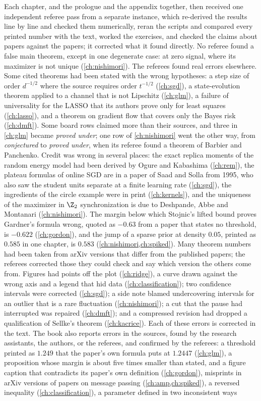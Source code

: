 Each chapter, and the prologue and the appendix together, then received one independent referee pass from a separate instance, which re-derived the results line by line and checked them numerically, reran the scripts and compared every printed number with the text, worked the exercises, and checked the claims about papers against the papers; it corrected what it found directly. No referee found a false main theorem, except in one degenerate case: at zero signal, where its maximizer is not unique (\cref{ch:nishimori}). The referees found real errors elsewhere. Some cited theorems had been stated with the wrong hypotheses: a step size of order $d^{-1/2}$ where the source requires order $t^{-1/2}$ (\cref{ch:sgd}), a state-evolution theorem applied to a channel that is not Lipschitz (\cref{ch:glm}), a failure of universality for the LASSO that its authors prove only for least squares (\cref{ch:lasso}), and a theorem on gradient flow that covers only the Bayes risk (\cref{ch:dmft}). Some board rows claimed more than their sources, and three in \cref{ch:glm} became \emph{proved under}; one row of \cref{ch:nishimori} went the other way, from \emph{conjectured} to \emph{proved under}, when its referee found a theorem of Barbier and Panchenko. Credit was wrong in several places: the exact replica moments of the random energy model had been derived by Ogure and Kabashima (\cref{ch:rem}), the plateau formulas of online SGD are in a paper of Saad and Solla from 1995, who also saw the student units separate at a finite learning rate (\cref{ch:sgd}), the ingredients of the circle example were in print (\cref{ch:kernels}), and the uniqueness of the maximizer in $\Z_2$ synchronization is due to Deshpande, Abbe and Montanari (\cref{ch:nishimori}). The margin below which Stojnic's lifted bound proves Gardner's formula wrong, quoted as $-0.63$ from a paper that states no threshold, is $-0.622$ (\cref{ch:gordon}), and the jump of a sparse prior at density $0.05$, printed as $0.585$ in one chapter, is $0.583$ (\cref{ch:nishimori,ch:spiked}). Many theorem numbers had been taken from arXiv versions that differ from the published papers; the referees corrected those they could check and say which version the others come from. Figures had points off the plot (\cref{ch:ridge}), a curve drawn against the wrong axis and a legend that hid data (\cref{ch:classification}); two confidence intervals were corrected (\cref{ch:sgd}); a side note blamed undercovering intervals for an outlier that is a rare fluctuation (\cref{ch:nishimori}); a cut that the pause had interrupted was repaired (\cref{ch:dmft}); and a compressed revision had dropped a qualification of Sellke's theorem (\cref{ch:kacrice}). Each of these errors is corrected in the text. The book also reports errors in the sources, found by the research assistants, the authors, or the referees, and confirmed by the referees: a threshold printed as $1.249$ that the paper's own formula puts at $1.2447$ (\cref{ch:glm}), a proposition whose margin is about five times smaller than stated, and a figure caption that contradicts its paper's own definition (\cref{ch:gordon}), misprints in arXiv versions of papers on message passing (\cref{ch:amp,ch:spiked}), a reversed inequality (\cref{ch:classification}), a parameter defined in two inconsistent ways 
